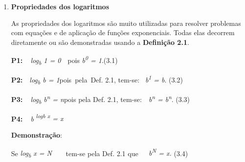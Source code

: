 \documentclass[12pt]{article}
\begin{document}
\begin{enumerate}[label*={\fontsize{14pt}{14pt}\selectfont \textbf{\arabic*.}}]
\tab \tab \tab \tab 
\vspace{\baselineskip}
\vspace{\baselineskip}
	\item {\fontsize{14pt}{16.8pt}\selectfont \textbf{Propriedades dos logaritmos}\par}\par


\vspace{\baselineskip}
\begin{justify}
As propriedades dos logaritmos são muito utilizadas para resolver problemas com equações e de aplicação de funções exponenciais. Todas elas decorrem diretamente ou são demonstradas usando a \textbf{Definição 2.1}.
\end{justify}\par


\vspace{\baselineskip}
\begin{justify}
\textbf{P1:\ \  }\textit{log\textsubscript{b} 1 = 0}\ \  \tab pois \textit{b\textsuperscript{0} = 1}.\tab \tab \tab \tab \tab \tab \tab (3.1)
\end{justify}\par

\begin{justify}
\textbf{P2:}\ \  \textit{log\textsubscript{b} b = 1}\tab pois\ pela\ Def. 2.1, tem-se:   \  \textit{b\textsuperscript{1} = b}. \tab \tab \tab \tab \tab \tab \tab (3.2)
\end{justify}\par

\begin{justify}
\textbf{P3:\ \  }\textit{log\textsubscript{b} b\textsuperscript{n} = n}\tab pois pela Def. 2.1, tem-se:\ \  \textit{b\textsuperscript{n} = b\textsuperscript{n}}. \tab \tab \tab \tab (3.3)
\end{justify}\par

\begin{justify}
\textbf{P4:\ \  }\textit{b}\textbf{ }\textit{\textsuperscript{logb x} = x\tab }
\end{justify}\par

\begin{justify}
\textbf{Demonstração}: 
\end{justify}\par

\begin{justify}
Se \textit{log\textsubscript{b} x = N\ \ \ \  }tem-se pela Def. 2.1 que\textit{\ \ \  b\textsuperscript{N }= x. \tab \tab \tab \tab }(3.4)
\end{justify}\par


\end{enumerate}
\end{document}
